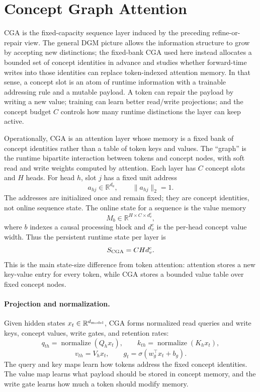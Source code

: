\section{Concept Graph Attention}
\label{sec:main-cga}

CGA is the fixed-capacity sequence layer induced by the preceding refine-or-repair view. The general DGM picture allows the information structure to grow by accepting new distinctions; the fixed-bank CGA used here instead allocates a bounded set of concept identities in advance and studies whether forward-time writes into those identities can replace token-indexed attention memory. In that sense, a concept slot is an atom of runtime information with a trainable addressing rule and a mutable payload. A token can repair the payload by writing a new value; training can learn better read/write projections; and the concept budget $C$ controls how many runtime distinctions the layer can keep active.

Operationally, CGA is an attention layer whose memory is a fixed bank of concept identities rather than a table of token keys and values. The ``graph'' is the runtime bipartite interaction between tokens and concept nodes, with soft read and write weights computed by attention. Each layer has $C$ concept slots and $H$ heads. For head $h$, slot $j$ has a fixed unit address
\[
a_{hj}\in \mathbb{R}^{d_a},
\qquad
\|a_{hj}\|_2=1 .
\]
The addresses are initialized once and remain fixed; they are concept identities, not online sequence state. The online state for a sequence is the value memory
\[
M_b\in\mathbb{R}^{H\times C\times d_v^c},
\]
where $b$ indexes a causal processing block and $d_v^c$ is the per-head concept value width. Thus the persistent runtime state per layer is
\[
S_{\rm CGA}=C H d_v^c .
\]
This is the main state-size difference from token attention: attention stores a new key-value entry for every token, while CGA stores a bounded value table over fixed concept nodes.

\paragraph{Projection and normalization.}
Given hidden states $x_t\in\mathbb{R}^{d_{\rm model}}$, CGA forms normalized read queries and write keys, concept values, write gates, and retention rates:
\[
q_{th}=\operatorname{normalize}(Q_h x_t),\qquad
k_{th}=\operatorname{normalize}(K_h x_t),
\]
\[
v_{th}=V_h x_t,\qquad
g_t=\sigma(w_g^\top x_t+b_g).
\]
The query and key maps learn how tokens address the fixed concept identities. The value map learns what payload should be stored in concept memory, and the write gate learns how much a token should modify memory.

